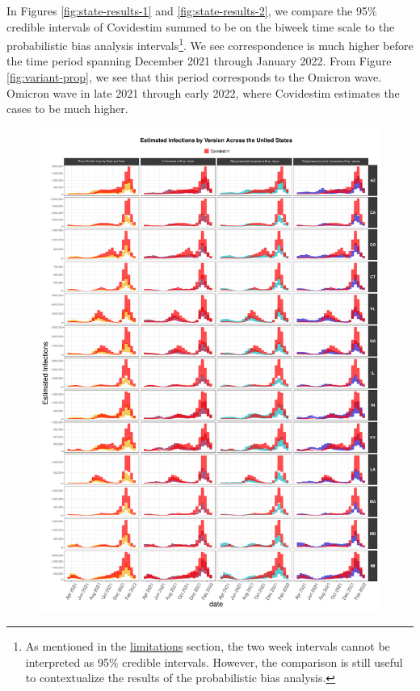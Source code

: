 \documentclass[12pt,twoside]{smiththesis}
\begin{document}
In Figures \ref{fig:state-results-1} and \ref{fig:state-results-2}, we compare the 95\% credible intervals of Covidestim summed to be on the biweek time scale to the probabilistic bias analysis intervals\footnote{As mentioned in the \protect\hyperlink{lims}{limitations} section, the two week intervals cannot be interpreted as 95\% credible intervals. However, the comparison is still useful to contextualize the results of the probabilistic bias analysis.}. We see correspondence is much higher before the time period spanning December 2021 through January 2022. From Figure \ref{fig:variant-prop}, we see that this period corresponds to the Omicron wave. Omicron wave in late 2021 through early 2022, where Covidestim estimates the cases to be much higher.
\begin{figure}
\includegraphics[width=1\linewidth]{figure/state_comp_covidestim1} \caption{\label{fig:state-results-1}}\label{fig:unnamed-chunk-4}
\end{figure}
\end{document}
